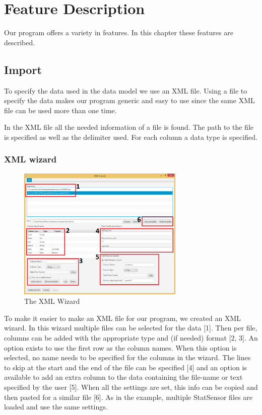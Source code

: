 \chapter{Feature Description}
Our program offers a variety in features. In this chapter these features are described.
\section{Import}
To specify the data used in the data model we use an XML file. Using a file to specify the data makes our program generic and easy to use since the same XML file can be used more than one time.

In the XML file all the needed information of a file is found. The path to the file is specified as well as the delimiter used. For each column a data type is specified. 
\subsection{XML wizard}
\begin{figure}[h!]
\centering
\includegraphics[width=300px]{chapters/image-featureDescription/xmlwizard-highlight.png}
\caption{The XML Wizard}
\end{figure}
To make it easier to make an XML file for our program, we created an XML wizard. In this wizard multiple files can be selected for the data [1]. Then per file, columns can be added with the appropriate type and (if needed) format [2, 3]. An option exists to use the first row as the column names. When this option is selected, no name needs to be specified for the columns in the wizard. The lines to skip at the start and the end of the file can be specified [4] and an option is available to add an extra column to the data containing the file-name or text specified by the user [5]. When all the settings are set, this info can be copied and then pasted for a similar file [6]. As in the example, multiple StatSensor files are loaded and use the same settings. 
